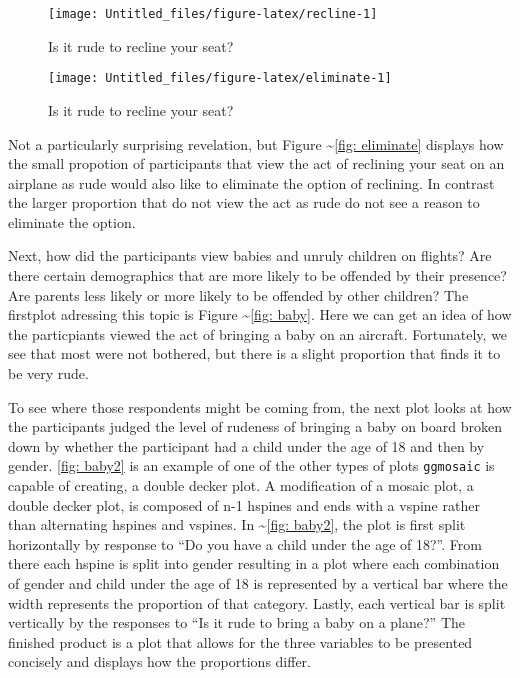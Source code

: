 \begin{Schunk}
\begin{figure}
\texttt{[image: Untitled\_files/figure-latex/recline-1]} \caption[Is it rude to recline your seat?]{Is it rude to recline your seat?}\label{fig:recline}
\end{figure}
\end{Schunk}

\begin{Schunk}
\begin{figure}
\texttt{[image: Untitled\_files/figure-latex/eliminate-1]} \caption[Is it rude to recline your seat?]{Is it rude to recline your seat?}\label{fig:eliminate}
\end{figure}
\end{Schunk}

Not a particularly surprising revelation, but Figure
\textasciitilde{}\ref{fig: eliminate} displays how the small propotion
of participants that view the act of reclining your seat on an airplane
as rude would also like to eliminate the option of reclining. In
contrast the larger proportion that do not view the act as rude do not
see a reason to eliminate the option.

Next, how did the participants view babies and unruly children on
flights? Are there certain demographics that are more likely to be
offended by their presence? Are parents less likely or more likely to be
offended by other children? The firstplot adressing this topic is Figure
\textasciitilde{}\ref{fig: baby}. Here we can get an idea of how the
particpiants viewed the act of bringing a baby on an aircraft.
Fortunately, we see that most were not bothered, but there is a slight
proportion that finds it to be very rude.

To see where those respondents might be coming from, the next plot looks
at how the participants judged the level of rudeness of bringing a baby
on board broken down by whether the participant had a child under the
age of 18 and then by gender. \ref{fig: baby2} is an example of one of
the other types of plots \texttt{ggmosaic} is capable of creating, a
double decker plot. A modification of a mosaic plot, a double decker
plot, is composed of n-1 hspines and ends with a vspine rather than
alternating hspines and vspines. In \textasciitilde{}\ref{fig: baby2},
the plot is first split horizontally by response to ``Do you have a
child under the age of 18?''. From there each hspine is split into
gender resulting in a plot where each combination of gender and child
under the age of 18 is represented by a vertical bar where the width
represents the proportion of that category. Lastly, each vertical bar is
split vertically by the responses to ``Is it rude to bring a baby on a
plane?'' The finished product is a plot that allows for the three
variables to be presented concisely and displays how the proportions
differ.

